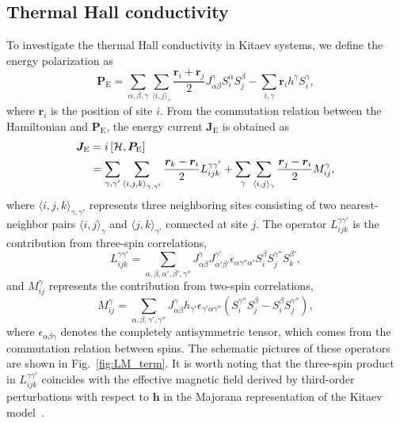 \documentclass[twocolumn,superscriptaddress,showpacs, longbibliography, aps, prx]{revtex4-2}
\begin{document}
\subsection{Thermal Hall conductivity}\label{subsec:Thermal Hall conductivity}
To investigate the thermal Hall conductivity in Kitaev systems, we define the energy polarization as~\cite{Katsura2010,NasuYM2017}
\begin{equation}
  \bm{P}_{\mathrm{E}} = \sum_{\alpha,\beta,\gamma}\sum_{\langle i,j\rangle_\gamma} \frac{\bm{r}_i + \bm{r}_j}{2} J_{\alpha\beta}^\gamma S_i^\alpha S_j^\beta - \sum_{i,\gamma} \bm{r}_i h^\gamma S_i^\gamma,
\end{equation}
where $\bm{r}_i$ is the position of site $i$. 
From the commutation relation between the Hamiltonian and $\bm{P}_{\mathrm{E}}$, the energy current $\bm{J}_{\mathrm{E}}$ is obtained as 
\begin{align}
  \bm{J}_{\mathrm{E}} &=  i \left[\mathcal{H}, \bm{P}_{\mathrm{E}}\right] \notag \\
&= \sum_{\gamma,\gamma'}\sum_{\langle i,j,k\rangle_{\gamma,\gamma'}} \frac{\bm{r}_k-\bm{r}_i}{2}L_{ijk}^{\gamma\gamma'} + \sum_{\gamma}\sum_{\langle i,j\rangle_{\gamma}} \frac{\bm{r}_j-\bm{r}_i}{2}M_{ij}^{\gamma} 
\label{eq:def_J},
\end{align}
where $\langle i,j,k\rangle_{\gamma,\gamma'}$ represents three neighboring sites consisting of two nearest-neighbor pairs $\langle i,j\rangle_{\gamma}$ and $\langle j,k\rangle_{\gamma'}$ connected at site $j$.
The operator $L_{ijk}^{\gamma\gamma'}$ is the contribution from three-spin correlations,
\begin{equation}
  L_{ijk}^{\gamma\gamma'} = \sum_{\alpha,\beta,\alpha',\beta',\gamma''} J_{\alpha\beta}^\gamma J_{\alpha'\beta'}^{\gamma'} \epsilon_{\alpha\gamma''\alpha'} S_i^\beta S_j^{\gamma''}S_k^{\beta'},
\label{eq:L}
\end{equation}
and $M_{ij}^\gamma$ represents the contribution from two-spin correlations,
\begin{equation}
  M_{ij}^{\gamma} = \sum_{\alpha,\beta,\gamma',\gamma''} J_{\alpha\beta}^\gamma h_{\gamma'} \epsilon_{\gamma'\alpha\gamma''} \left(S_i^{\gamma''} S_j^{\beta} - S_i^{\beta} S_j^{\gamma''} \right),
\label{eq:M}
\end{equation}
where $\epsilon_{\alpha\beta\gamma}$ denotes the completely antisymmetric tensor, which comes from the commutation relation between spins. 
The schematic pictures of these operators are shown in Fig.~\ref{fig:LM_term}. 
It is worth noting that the three-spin product in $L_{ijk}^{\gamma\gamma'}$ coincides with the effective magnetic field derived by third-order perturbations with respect to $\bm{h}$ in the Majorana representation of the Kitaev model~\cite{Kitaev2006,NasuYM2017}.
\end{document}
